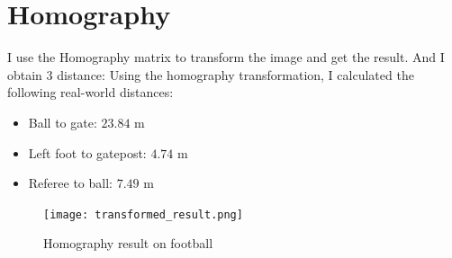 \documentclass[]{article}
\begin{document}
\newpage
\section{Homography}
I use the Homography matrix to transform the image and get the result.
And I obtain 3 distance: 
Using the homography transformation, I calculated the following real-world distances:
\begin{itemize}
	\item Ball to gate: $23.84$ m
	\item Left foot to gatepost: $4.74$ m
	\item Referee to ball: $7.49$ m
\end{itemize}
\begin{figure}[h]
	\centering
	\texttt{[image: transformed\_result.png]}
	\caption{Homography result on football}
	\label{1}
\end{figure}

\newpage
\end{document}
